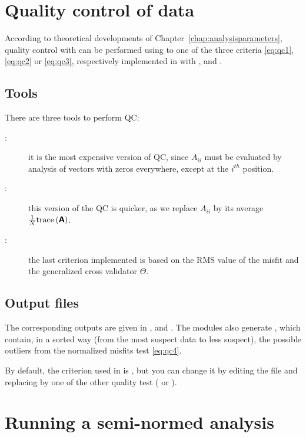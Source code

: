 \section{Quality control of data}

According to theoretical developments of Chapter~\ref{chap:analysisparameters}, quality control with \diva can be performed using to one of the three criteria \eqref{eq:qc1}, \eqref{eq:qc2} or \eqref{eq:qc3}, respectively implemented in \diva with ,  and . 



\subsection{Tools}

There are three tools to perform QC:
\begin{description}
\item[:] it is the most expensive version of QC, since $A_{ii}$ must be evaluated by analysis of vectors with zeros everywhere, except at the $i^{th}$ position.
\item[:] this version of the QC is quicker, as we replace $A_{ii}$ by its average $\frac{1}{N}\mathrm{trace}\left( \mbox{\boldmath $ \protect\mathsf{A} $} \right)$.
\item[:] the last criterion implemented is based on the RMS value of the misfit and the generalized cross validator $\Theta$. 
\end{description}

\subsection{Output files}

The corresponding outputs are given in ,  and .
The modules  also generate , which contain, in a sorted way (from the most suspect data to less suspect), the possible outliers from the normalized misfits test \eqref{eq:qc4}.

\btips
By default, the criterion used in  is , but you can change it by editing the file  and replacing  by one of the other quality test ( or ).
\etips


\section{Running a semi-normed analysis}

